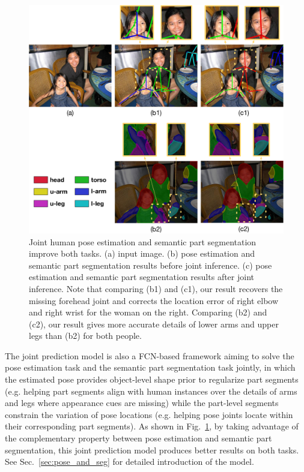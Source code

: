 \begin{figure}
 \includegraphics[width=1.0\linewidth]{figs/intuition_cvpr.pdf}
\caption{Joint human pose estimation and semantic part segmentation improve both tasks. (a) input image. (b) pose estimation and semantic part segmentation results before joint inference. (c) pose estimation and semantic part segmentation results after joint inference. Note that comparing (b1) and (c1), our result recovers the missing forehead joint and corrects the location error of right elbow and right wrist for the woman on the right. Comparing (b2) and (c2), our result gives more accurate details of lower arms and upper legs than (b2) for both people.}
\label{fig:motivation_cvpr}
\end{figure}

The joint prediction model is also a FCN-based framework aiming to solve the pose estimation task and the semantic part segmentation task jointly, in which the estimated pose provides object-level shape prior to regularize part segments (e.g. helping part segments align with human instances over the details of arms and legs where appearance cues are missing) while the part-level segments constrain the variation of pose locations (e.g. helping pose joints locate within their corresponding part segments). As shown in Fig.~\ref{fig:motivation_cvpr}, by taking advantage of the complementary property between pose estimation and semantic part segmentation, this joint prediction model produces better results on both tasks. See Sec.~\ref{sec:pose_and_seg} for detailed introduction of the model.

